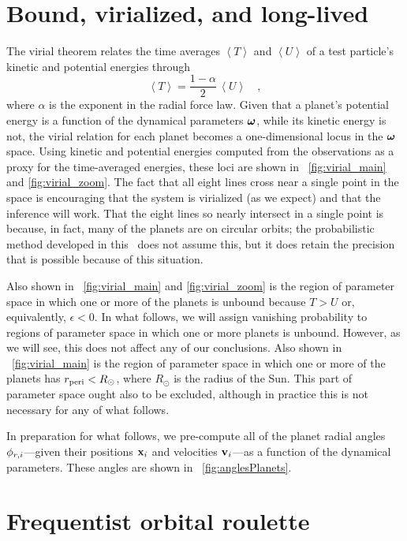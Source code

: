 \section{Bound, virialized, and long-lived}

The virial theorem relates the time averages $\left<T\right>$ and
$\left<U\right>$ of a test particle's kinetic and potential energies
through
\begin{equation}\label{eq:virialtheorem}
\left<T\right> = \frac{1-\alpha}{2}\,\left<U\right> \quad,
\end{equation}
where $\alpha$ is the exponent in the radial force law.  Given that a
planet's potential energy is a function of the dynamical parameters
$\boldsymbol{{\omega}}$, while its kinetic energy is not, the virial relation for
each planet becomes a one-dimensional locus in the $\boldsymbol{{\omega}}$ space.
Using kinetic and potential energies computed from the observations as
a proxy for the time-averaged energies, these loci are shown in
\figurenames~\ref{fig:virial_main} and \ref{fig:virial_zoom}.  The
fact that all eight lines cross near a single point in the space is
encouraging that the system is virialized (as we expect) and that the
inference will work. That the eight lines so nearly intersect in a
single point is because, in fact, many of the planets are on circular
orbits; the probabilistic method developed in this \chaptername\ does
not assume this, but it does retain the precision that is possible
because of this situation.

Also shown in \figurenames~\ref{fig:virial_main} and
\ref{fig:virial_zoom} is the region of parameter space in which one or
more of the planets is unbound because $T>U$ or, equivalently,
$\epsilon < 0$.  In what follows, we will assign vanishing probability
to regions of parameter space in which one or more planets is
unbound. However, as we will see, this does not affect any of our
conclusions. Also shown in \figurename~\ref{fig:virial_main} is the
region of parameter space in which one or more of the planets has
$r_{\mathrm{peri}}<R_\odot$, where $R_\odot$ is the radius of the Sun.  This part
of parameter space ought also to be excluded, although in practice
this is not necessary for any of what follows.

In preparation for what follows, we pre-compute all of the planet
radial angles $\phi_{r,i}$---given their positions $\boldsymbol{\mathbf{x}}_i$ and
velocities $\boldsymbol{\mathbf{v}}_i$---as a function of the dynamical parameters.  These
angles are shown in \figurename~\ref{fig:anglesPlanets}.

\section{Frequentist orbital roulette}\label{sec:freq}


